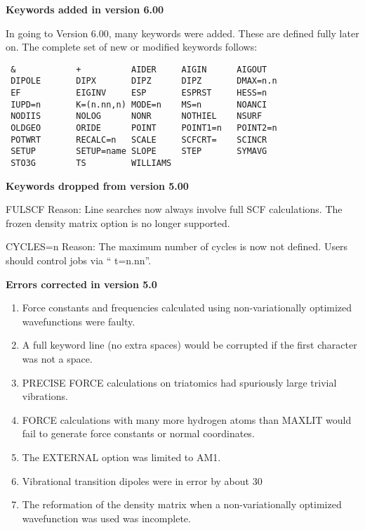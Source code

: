 \pagebreak

\begin{center}{\Large\bf Keywords added in version 6.00}\end{center}

      In going to Version 6.00, many keywords were added.  These  are
 defined  fully  later  on.   The  complete  set  of  new or modified
 keywords follows:
\begin{verbatim}
 &            +          AIDER     AIGIN      AIGOUT     
 DIPOLE       DIPX       DIPZ      DIPZ       DMAX=n.n      
 EF           EIGINV     ESP       ESPRST     HESS=n       
 IUPD=n       K=(n.nn,n) MODE=n    MS=n       NOANCI      
 NODIIS       NOLOG      NONR      NOTHIEL    NSURF   
 OLDGEO       ORIDE      POINT     POINT1=n   POINT2=n      
 POTWRT       RECALC=n   SCALE     SCFCRT=    SCINCR  
 SETUP        SETUP=name SLOPE     STEP       SYMAVG      
 STO3G        TS         WILLIAMS
\end{verbatim}

                  
\begin{center}{\Large\bf Keywords dropped from version 5.00}\end{center}

 FULSCF  Reason:   Line  searches  now  always   involve   full   SCF
 calculations.   The  frozen  density  matrix  option  is  no  longer
 supported.

 CYCLES=n Reason:  The maximum number of cycles is now  not  defined.
 Users should control jobs via `` t=n.nn''.


                   
\begin{center}{\Large\bf Errors corrected in version 5.0}\end{center}

\begin{enumerate}
\item Force constants and frequencies  calculated  using  non-variationally
 optimized wavefunctions were faulty.
\item A full keyword line (no extra spaces) would be corrupted if the first
 character was not a space.
\item PRECISE FORCE calculations on triatomics had spuriously large trivial
 vibrations.
\item FORCE calculations with many more hydrogen atoms  than  MAXLIT  would
 fail to generate force constants or normal coordinates.
\item The EXTERNAL option was limited to AM1.
\item Vibrational transition dipoles were in error by about 30%
\item The reformation  of  the  density  matrix  when  a  non-variationally
 optimized wavefunction was used was incomplete.
\end{enumerate} 

